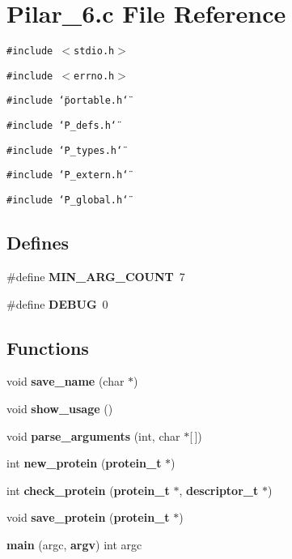 \section{Pilar\_\-6.c File Reference}
\label{Pilar__6_8c}
{\tt \#include $<$stdio.h$>$}\par
{\tt \#include $<$errno.h$>$}\par
{\tt \#include \char`\"{}portable.h\char`\"{}}\par
{\tt \#include \char`\"{}P\_\-defs.h\char`\"{}}\par
{\tt \#include \char`\"{}P\_\-types.h\char`\"{}}\par
{\tt \#include \char`\"{}P\_\-extern.h\char`\"{}}\par
{\tt \#include \char`\"{}P\_\-global.h\char`\"{}}\par
\subsection*{Defines}
\begin{CompactItemize}
\item 
\#define {\bf MIN\_\-ARG\_\-COUNT}\ 7
\item 
\#define {\bf DEBUG}\ 0
\end{CompactItemize}
\subsection*{Functions}
\begin{CompactItemize}
\item 
void {\bf save\_\-name} (char $\ast$)
\item 
void {\bf show\_\-usage} ()
\item 
void {\bf parse\_\-arguments} (int, char $\ast$[$\,$])
\item 
int {\bf new\_\-protein} ({\bf protein\_\-t} $\ast$)
\item 
int {\bf check\_\-protein} ({\bf protein\_\-t} $\ast$, {\bf descriptor\_\-t} $\ast$)
\item 
void {\bf save\_\-protein} ({\bf protein\_\-t} $\ast$)
\item 
{\bf main} (argc, {\bf argv}) int argc
\end{CompactItemize}
